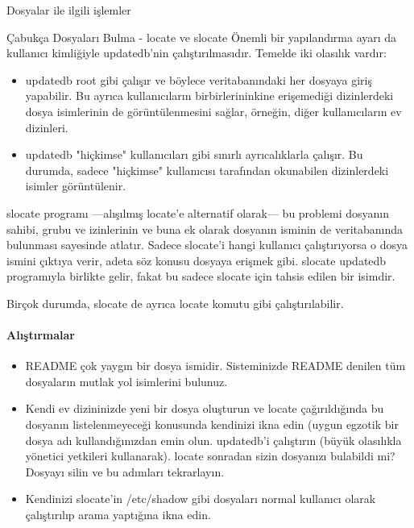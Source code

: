 \begin{section}{Dosyalar ile ilgili işlemler}
\begin{subsection}{Çabukça Dosyaları Bulma - locate ve slocate}
	Önemli bir yapılandırma ayarı da kullanıcı kimliğiyle updatedb'nin çalıştırılmasıdır. Temelde iki olasılık vardır:
	\begin{itemize}
	\item updatedb root gibi çalışır ve böylece veritabanındaki her dosyaya giriş yapabilir. Bu ayrıca kullanıcıların birbirlerininkine erişemediği dizinlerdeki dosya isimlerinin de görüntülenmesini sağlar, örneğin, diğer kullanıcıların ev dizinleri.
	\item updatedb "hiçkimse" kullanıcıları gibi sınırlı ayrıcalıklarla çalışır. Bu durumda, sadece "hiçkimse" kullanıcısı tarafından okunabilen dizinlerdeki isimler görüntülenir. 
	\end{itemize}
	
slocate programı —alışılmış locate'e alternatif olarak— bu problemi dosyanın sahibi, grubu ve  izinlerinin ve buna ek olarak dosyanın isminin de veritabanında bulunması sayesinde atlatır. Sadece slocate'i hangi kullanıcı çalıştırıyorsa o dosya ismini çıktıya verir, adeta söz konusu dosyaya erişmek gibi. slocate updatedb programıyla birlikte gelir, fakat bu sadece slocate için tahsis edilen bir isimdir.

Birçok durumda, slocate de ayrıca locate komutu gibi çalıştırılabilir.

\paragraph{Alıştırmalar}{
\begin{itemize}
 \item README çok yaygın bir dosya ismidir. Sisteminizde README denilen tüm dosyaların mutlak yol isimlerini bulunuz.
 \item Kendi ev dizininizde yeni bir dosya oluşturun ve locate çağırıldığında bu dosyanın listelenmeyeceği konusunda kendinizi ikna edin (uygun egzotik bir dosya adı kullandığınızdan emin olun. updatedb'i çalıştırın (büyük olasılıkla yönetici yetkileri kullanarak). locate sonradan sizin dosyanızı bulabildi mi? Dosyayı silin ve bu adımları tekrarlayın.
 \item Kendinizi slocate'in /etc/shadow gibi dosyaları normal kullanıcı olarak çalıştırılıp arama yaptığına ikna edin.
\end{itemize}}


\end{subsection}
\end{section}
